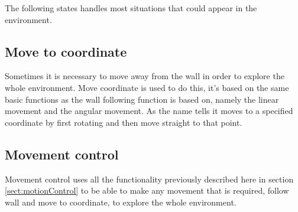 The following states handles most situations that could appear in the environment.

\subsection{Move to coordinate}

Sometimes it is necessary to move away from the wall in order to explore the whole environment. Move coordinate is used to do this, it’s based on the same basic functions as the wall following function is based on, namely the linear movement and the angular movement. As the name tells it moves to a specified coordinate by first rotating and then move straight to that point.

\subsection{Movement control}

Movement control uses all the functionality previously described here in section \ref{sect:motionControl} to be able to make any movement that is required, follow wall and move to coordinate, to explore the whole environment.